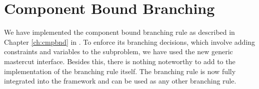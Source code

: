 \section{Component Bound Branching}\label{sec:cmpbnd}
We have implemented the component bound branching rule as described in Chapter \ref{ch:cmpbnd} in \GCG{}. To enforce its branching decisions, which involve adding constraints and variables to the subproblem, we have used the new generic mastercut interface. Besides this, there is nothing noteworthy to add to the implementation of the branching rule itself. The branching rule is now fully integrated into the \GCG{} framework and can be used as any other branching rule.

